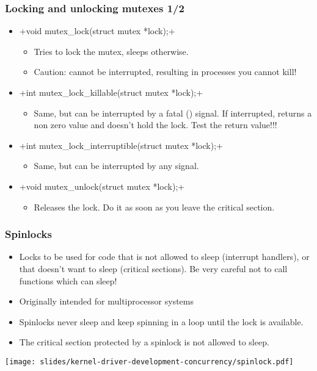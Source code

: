 \begin{frame}[fragile]
  \frametitle{Locking and unlocking mutexes 1/2}
  \begin{itemize}
  \item {}+void mutex_lock(struct mutex *lock);+
    \begin{itemize}
    \item Tries to lock the mutex, sleeps otherwise.
    \item Caution: cannot be interrupted, resulting in processes you
      cannot kill!
    \end{itemize}
  \item {}+int mutex_lock_killable(struct mutex *lock);+
    \begin{itemize}
    \item Same, but can be interrupted by a fatal () signal. If
      interrupted, returns a non zero value and doesn't hold the
      lock. Test the return value!!!
    \end{itemize}
  \item {}+int mutex_lock_interruptible(struct mutex *lock);+
    \begin{itemize}
    \item Same, but can be interrupted by any signal.
    \end{itemize}
  \item {}+void mutex_unlock(struct mutex *lock);+
    \begin{itemize}
    \item Releases the lock. Do it as soon as you leave the critical
      section.
    \end{itemize}
  \end{itemize}
\end{frame}

\begin{frame}
  \frametitle{Spinlocks}
  \begin{itemize}
  \item Locks to be used for code that is not allowed to sleep
    (interrupt handlers), or that doesn't want to sleep (critical
    sections). Be very careful not to call functions which can sleep!
  \item Originally intended for multiprocessor systems
  \item Spinlocks never sleep and keep spinning in a loop until the
    lock is available.
  \item The critical section protected by a spinlock is not allowed to
    sleep.
  \end{itemize}
  \begin{center}
    \texttt{[image: slides/kernel-driver-development-concurrency/spinlock.pdf]}
  \end{center}
\end{frame}

